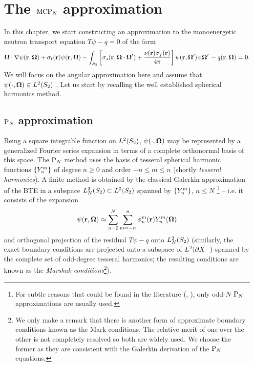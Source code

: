 \ifpdf
	\graphicspath{{4/pic/PNG/}{4/pic/PDF/}{4/pic/}}
\else
	\graphicspath{{4/pic/EPS/}{4/pic/}}
\fi

\chapter{The $\MCPN$ approximation}\label{chap:mcpn}

In this chapter, we start constructing an approximation to the monoenergetic neutron transport equation $T\psi - q = 0$
of the form
\begin{equation}\label{eq:MC-bte}
    \bomega\cdot\nabla\psi(\br,\bomega) + \sigma_t(\br)\psi(\br,\bomega) - \intA[']{\left[\sigma_s(\br,\bomega\cdot\bomega') + 
    \frac{\nu(\br)\sigma_f(\br)}{4\pi}\right]\psi(\br,\bomega')} - q(\br,\bomega) = 0.
\end{equation}
We will focus on the angular approximation here and assume that $\psi(\cdot,\bomega)\in\Lp[2](\Sphere)$
. 
Let us start by recalling the well established spherical harmonics method.

\section{$\PN$ approximation}\label{sec:SPH}
Being a square integrable function on $\Lp[2](\Sphere)$, $\psi(\cdot,\bomega)$ may be represented by a generalized
Fourier series expansion in terms of a complete orthonormal basis of this space. The $\PN$ method uses the basis of
tesseral spherical harmonic functions $\{\Y{n}{m}\}$ of degree $n\geq 0$ and order $-n \leq m \leq n$ (shortly
\textit{tesseral harmonics}). A finite method is obtained by the classical Galerkin approximation of the BTE in a
subspace $\Lp[2]_N(\Sphere)\subset\Lp[2](\Sphere)$ spanned by $\{\Y{n}{m}\}$,  $n \leq N$ \footnote{For subtle reasons
that could be found in the literature (\cite[Sec. 10.3.2]{Davison}, \cite[Sec. 9.6]{Stacey1}), only odd-$N$ $\PN$
approximations are usually used.} -- i.e. it consists of the expansion
\begin{equation}\label{eq:exp}
  \psi(\br,\bomega) \approx \suma[n]{0}{N}\suma[m]{-n}{n}\angmom{n}{m}(\br)\Y{n}{m}(\bomega)
\end{equation}
and orthogonal projection of the residual $T\psi - q$ onto $\Lp[2]_N(\Sphere)$ (similarly, the exact boundary conditions 
are projected onto a subspace of $\Lp[2](\pX[-])$ spanned by the complete set of odd-degree tesseral harmonics; 
the resulting conditions are known as the \textit{Marshak conditions}\footnote{We only make a remark that there is 
another form of approximate boundary conditions known as the Mark conditions. The relative merit of one over the other 
is not completely resolved so both are widely used. We choose the former as they are consistent with the Galerkin 
derivation of the $\PN$ equations.}).

